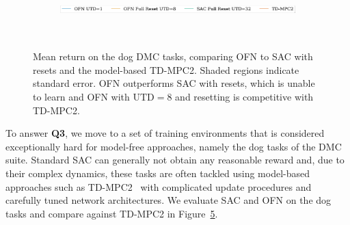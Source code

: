 \begin{figure}[t]
\centering
    \begin{subfigure}[b]{0.8\textwidth}
        \centering
        \includegraphics[height=0.4cm]{figures/dissecting/dog_exp/dog_legend.pdf}
    \end{subfigure}\\%
    \begin{subfigure}[t]{0.25\textwidth}
        \centering
        \label{subfig:overestimation:dog_stand}
    \end{subfigure}%
    \begin{subfigure}[t]{0.25\textwidth}
        \centering
        \label{subfig:overestimation:dog_walk}
    \end{subfigure}%
    \begin{subfigure}[t]{0.25\textwidth}
    \centering
        \label{subfig:overestimation:dog_trot}
    \end{subfigure}%
    \begin{subfigure}[t]{0.25\textwidth}
        \centering
        \label{subfig:overestimation:dog_run}
    \end{subfigure}%
    \caption{Mean return on the dog DMC tasks, comparing OFN to SAC with resets and the model-based TD-MPC2. Shaded regions indicate standard error. OFN outperforms SAC with resets, which is unable to learn and OFN with $\mathrm{UTD}=8$ and resetting is competitive with TD-MPC2.}
    \label{fig:overestimationall_dog}
\end{figure}

To answer \textbf{Q3}, we move to a set of training environments that is considered exceptionally hard for model-free approaches, namely the dog tasks of the DMC suite. Standard SAC can generally not obtain any reasonable reward and, due to their complex dynamics, these tasks are often tackled using model-based approaches such as TD-MPC2~\parencite{hansen2024tdmpc} with complicated update procedures and carefully tuned network architectures. We evaluate SAC and OFN on the dog tasks and compare against TD-MPC2 in Figure~\ref{fig:overestimationall_dog}.

